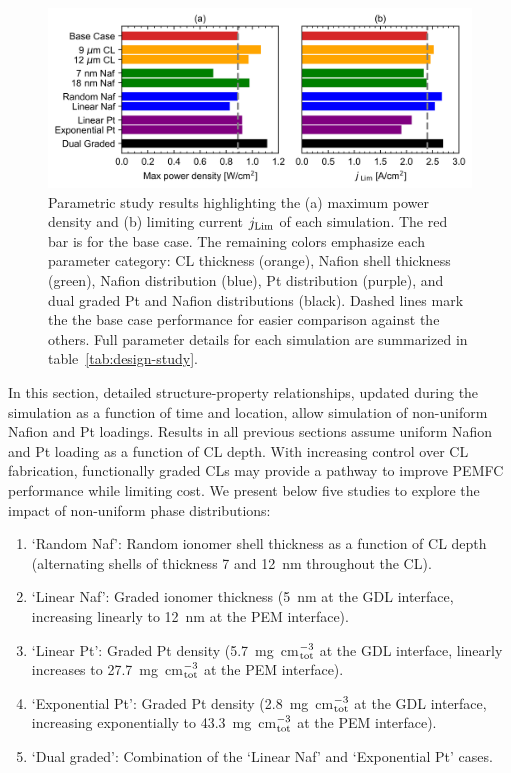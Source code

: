 \documentclass[final,3p,times,twocolumn]{elsarticle}    %
\newcommand{\crr}[1]{\color{red} #1 \color{black}}
\begin{document}
\begin{figure}[!htb]
    \centering
    \includegraphics[width=6.238in]{figures_uniform/bar-charts-6_288in.png}
    \crr{
    \caption{Parametric study results highlighting the (a) maximum power density and (b) limiting current $j_{\rm Lim}$ of each simulation. The red bar is for the base case. The remaining colors emphasize each parameter category: CL thickness (orange), Nafion shell thickness (green), Nafion distribution (blue), Pt distribution (purple), and dual graded Pt and Nafion distributions (black). Dashed lines mark the the base case performance for easier comparison against the others. Full parameter details for each simulation are summarized in table~\ref{tab:design-study}.}}
    \label{fig:bar-charts}
\end{figure}

In this section, detailed structure-property relationships, updated during the simulation as a function of time and location, allow simulation of non-uniform Nafion and Pt loadings. \crr{Results in all previous sections} assume uniform Nafion and Pt loading as a function of CL depth. %
With increasing control over CL fabrication, functionally graded CLs may provide a pathway to improve PEMFC performance while limiting cost. We present below five studies to explore the impact of non-uniform phase distributions:
\begin{enumerate}
    \item `Random Naf': Random ionomer shell thickness as a function of CL depth (alternating shells of thickness 7 and 12~nm throughout the CL).
    \item `Linear Naf': Graded ionomer thickness (5~nm at the GDL interface, increasing linearly to 12~nm at the PEM interface).
    \item `Linear Pt': Graded Pt density (5.7~mg~cm$^{-3}_{\rm tot}$ at the GDL interface, linearly increases to 27.7~mg~cm$^{-3}_{\rm tot}$ at the PEM interface).
    \item `Exponential Pt': Graded Pt density (2.8~mg~cm$^{-3}_{\rm tot}$ at the GDL interface, increasing exponentially to 43.3~mg~cm$^{-3}_{\rm tot}$ at the PEM interface).
    \item `Dual graded': Combination of the `Linear Naf' and `Exponential Pt' cases.
\end{enumerate}
\end{document}
